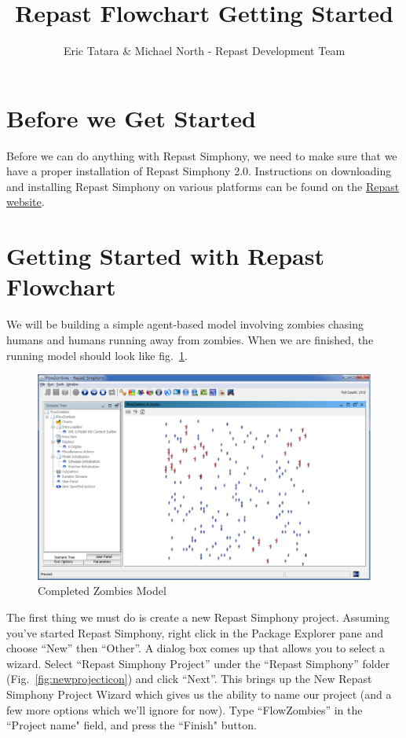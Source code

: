 \documentclass[11pt]{amsart}
\title{Repast Flowchart Getting Started}
\author{Eric Tatara \& Michael North - Repast Development Team}
\begin{document}
 
\maketitle
\setcounter{section}{-1}

\section{Before we Get Started}
Before we can do anything with Repast Simphony, we need to make sure that we have a proper installation of Repast Simphony 2.0. Instructions on downloading and installing Repast Simphony on various platforms can be found on the \href{http://repast.sourceforge.net/download.html}{Repast website}.

\section{Getting Started with Repast Flowchart}
We will be building a simple agent-based model involving zombies chasing humans and humans running away from zombies. When we are finished, the running model should look like fig.~\ref{fig:final}.

\begin{figure}[h]
\begin{center}
\vspace{.2in}
\centerline {
\includegraphics[width=5in]{figs/final.eps}
}
\caption{Completed Zombies Model}
\label{fig:final}
\end{center}
\end{figure}

The first thing we must do is create a new Repast Simphony project. Assuming you've started Repast Simphony, right click in the Package Explorer pane and choose ``New'' then ``Other''. A dialog box comes up that allows you to select a wizard. Select ``Repast Simphony Project'' under the ``Repast Simphony'' folder (Fig.~\ref{fig:newprojecticon}) and click ``Next''. This brings up the New Repast Simphony Project Wizard  which gives us the ability to name our project (and a few more options which we'll ignore for now). Type ``FlowZombies'' in the ``Project name" field, and press the ``Finish" button.
\end{document}
